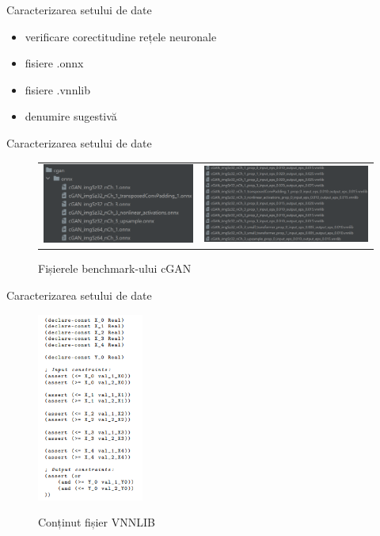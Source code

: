 
\begin{frame}{Caracterizarea setului de date}
    \begin{itemize}
        \item verificare corectitudine rețele neuronale
        \item fisiere .onnx
        \item fisiere .vnnlib
        \item denumire sugestivă
    \end{itemize}
\end{frame}

\begin{frame}{Caracterizarea setului de date}
    \begin{figure}[ht]
    \begin{tabular}{cc}
    \hspace{0cm} {\includegraphics[width=5.5cm]{images/caracterizare/onnx.png}} &
    \hspace{-0.5cm} {\includegraphics[width=6cm]{images/caracterizare/vnnlib.png}}
    \end{tabular}
    \caption{Fișierele benchmark-ului cGAN}
    \end{figure}
\end{frame}

\begin{frame}{Caracterizarea setului de date}
    \begin{figure}[ht]
    \centering
    {\includegraphics[width=3.5cm]{images/caracterizare/continutVNNLIB.png}}
    \caption{Conținut fișier VNNLIB}
    \label{obstacole}
    \end{figure}
\end{frame}

